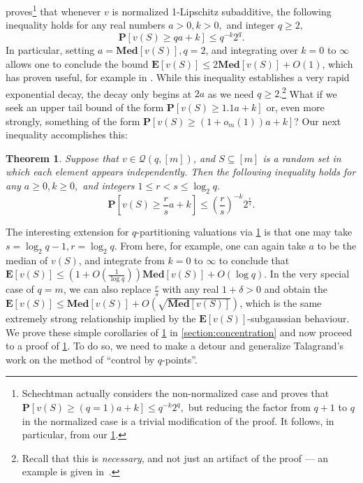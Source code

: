 \documentclass[11pt]{article}\usepackage{amsfonts}
\newtheorem{theorem}{Theorem}
\numberwithin{theorem}{subsection}
\newcommand{\prob}{\mathbf{P}}
\newcommand{\median}{\mathbf{Med}}
\newcommand{\expect}{\mathbf{E}}
\begin{document}
\cite{schectman} proves\footnote{Schechtman actually considers the non-normalized case and proves that $\prob[v(S)\ge (q=1)a + k]\le 
q^{-k}2^q,$ but reducing the factor from $q+1$ to $q$ in the normalized case is a trivial modification of the proof. It follows, in particular, from our \cref{thm:qparttailspecial}.} that whenever $v$ is normalized 1-Lipschitz subadditive, the following inequality holds for any real numbers $a>0, k>0,$ and integer $q\ge 2,$ \begin{equation}
\label{eq:schehtman}
\prob[v(S)\ge qa + k]\le 
q^{-k}2^q.
\end{equation} In particular, setting $a = \median[v(S)],q=2$, and integrating over $k=0$ to $\infty$ allows one to conclude the bound $\expect[v(S)]\le 2\median[v(S)] + O(1)$, which has proven useful, for example in \cite{RubinsteinW18}. While this inequality establishes a very rapid exponential decay, the decay only begins at  $2a$ as we need $q\ge 2$.\footnote{Recall that this is \emph{necessary}, and not just an artifact of the proof --- an example is given in~\cite{Vondrak10}.} What if we seek an upper tail bound of the form $\prob[v(S)\ge 1.1a + k]$ or, even more strongly, something of the form  $\prob[v(S)\ge (1 + {o_m(1)})a + k]$? Our next inequality accomplishes this:

\begin{theorem}
\label{thm:qparttailspecial}
Suppose that $v\in \mathcal{Q}(q,[m])$, and $S\subseteq [m]$ is a random set in which each element appears independently. Then the following inequality holds for any $ a \ge 0, k\ge 0,$ and integers $1\le r < s\le \log_2 q.$
    $$
    \prob\left[v(S)\ge \frac{r}{s}a+k\right]\le 
    \left(\frac{r}{s}\right)^{-k}2^\frac{r}{s}.
    $$
\end{theorem}

 The interesting extension for $q$-partitioning valuations via \cref{thm:qparttailspecial} is that one may take\linebreak $s = \log_2 q-1, r = \log_2 q$. From here, for example, one can again take $a$ to be the median of $v(S)$, and integrate from $k=0$ to $\infty$ to conclude that $\expect[v(S)]\le (1 + O(\frac{1}{\log q}))\median[v(S)] + O(\log q).$
In the very special case of $q=m$, we can also replace $\frac{r}{s}$ with any real $1+ \delta >0$ and obtain the $\expect[v(S)]\le \median[v(S)] + O(\sqrt{\median[v(S)]})$, which is the same extremely strong relationship implied by the $\expect[v(S)]$-subgaussian behaviour. We prove these simple corollaries of \cref{thm:qparttailspecial} in \cref{section:concentration} and now proceed to 
a proof of 
\cref{thm:qparttailspecial}. To do so, we need to make a detour and generalize Talagrand's work on the method of ``control by $q$-points''.
\end{document}
